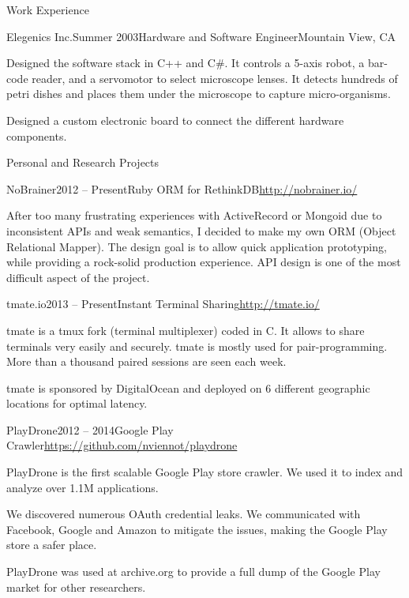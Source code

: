 \documentclass{resume} %
\begin{document}
\begin{rSection}{Work Experience}
\begin{rSubsection}{Elegenics Inc.}{Summer 2003}{Hardware and Software Engineer}{Mountain View, CA}
\item Designed the software stack in C++ and C\#. It controls a 5-axis
      robot, a bar-code reader, and a servomotor to select microscope lenses.
      It detects hundreds of petri dishes and places them under the
      microscope to capture micro-organisms.
\item Designed a custom electronic board to connect the different hardware components.
\end{rSubsection}

\end{rSection}


\begin{rSection}{Personal and Research Projects}
\begin{rSubsection}{NoBrainer}{2012 -- Present}{Ruby ORM for RethinkDB}{\url{http://nobrainer.io/}}
\item After too many frustrating experiences with ActiveRecord or Mongoid due to
  inconsistent APIs and weak semantics, I decided to make my own ORM (Object Relational Mapper).
  The design goal is to allow quick application prototyping, while providing a rock-solid production experience.
  API design is one of the most difficult aspect of the project.
\end{rSubsection}

\clearpage

\begin{rSubsection}{tmate.io}{2013 -- Present}{Instant Terminal Sharing}{\url{http://tmate.io/}}
\item tmate is a tmux fork (terminal multiplexer) coded in C. It allows to share
  terminals very easily and securely. tmate is mostly used for pair-programming.
      More than a thousand paired sessions are seen each week.
\item tmate is sponsored by DigitalOcean and deployed on 6 different geographic locations for optimal latency.
\end{rSubsection}

\begin{rSubsection}{PlayDrone}{2012 -- 2014}{Google Play Crawler}{\url{https://github.com/nviennot/playdrone}}
\item PlayDrone is the first scalable Google Play store crawler. We used it to index and analyze over 1.1M applications.
\item We discovered numerous OAuth credential leaks. We communicated with Facebook,
    Google and Amazon to mitigate the issues, making the Google Play store a safer place.
\item PlayDrone was used at archive.org to provide a full dump of the Google Play market for other researchers.
\end{rSubsection}


\end{rSection}
\end{document}
